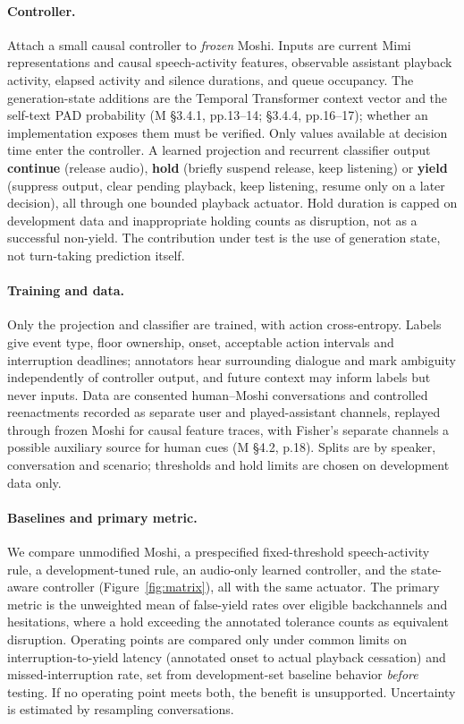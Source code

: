 \documentclass[11pt,a4paper,twocolumn]{article}
\newcommand{\M}{\textsc{M}}
\begin{document}
\paragraph{Controller.} Attach a small causal controller to \emph{frozen} Moshi. Inputs are current Mimi representations and causal speech-activity features, observable assistant playback activity, elapsed activity and silence durations, and queue occupancy. The generation-state additions are the Temporal Transformer context vector and the self-text PAD probability (\M{} \S3.4.1, pp.13--14; \S3.4.4, pp.16--17); whether an implementation exposes them must be verified. Only values available at decision time enter the controller. A learned projection and recurrent classifier output \textbf{continue} (release audio), \textbf{hold} (briefly suspend release, keep listening) or \textbf{yield} (suppress output, clear pending playback, keep listening, resume only on a later decision), all through one bounded playback actuator. Hold duration is capped on development data and inappropriate holding counts as disruption, not as a successful non-yield. The contribution under test is the use of generation state, not turn-taking prediction itself.

\paragraph{Training and data.} Only the projection and classifier are trained, with action cross-entropy. Labels give event type, floor ownership, onset, acceptable action intervals and interruption deadlines; annotators hear surrounding dialogue and mark ambiguity independently of controller output, and future context may inform labels but never inputs. Data are consented human--Moshi conversations and controlled reenactments recorded as separate user and played-assistant channels, replayed through frozen Moshi for causal feature traces, with Fisher's separate channels a possible auxiliary source for human cues (\M{} \S4.2, p.18). Splits are by speaker, conversation and scenario; thresholds and hold limits are chosen on development data only.

\paragraph{Baselines and primary metric.} We compare unmodified Moshi, a prespecified fixed-threshold speech-activity rule, a development-tuned rule, an audio-only learned controller, and the state-aware controller (Figure~\ref{fig:matrix}), all with the same actuator. The primary metric is the unweighted mean of false-yield rates over eligible backchannels and hesitations, where a hold exceeding the annotated tolerance counts as equivalent disruption. Operating points are compared only under common limits on interruption-to-yield latency (annotated onset to actual playback cessation) and missed-interruption rate, set from development-set baseline behavior \emph{before} testing. If no operating point meets both, the benefit is unsupported. Uncertainty is estimated by resampling conversations.
\end{document}
